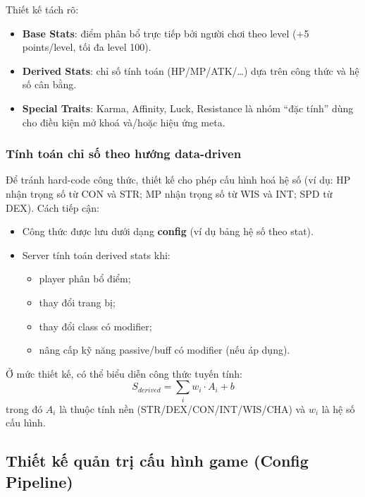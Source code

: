 Thiết kế tách rõ:
\begin{itemize}
    \item \textbf{Base Stats}: điểm phân bổ trực tiếp bởi người chơi theo level (+5 points/\allowbreak level, tối đa level 100).
    \item \textbf{Derived Stats}: chỉ số tính toán (HP/\allowbreak MP/\allowbreak ATK/\ldots) dựa trên công thức và hệ số cân bằng.
    \item \textbf{Special Traits}: Karma, Affinity, Luck, Resistance là nhóm ``đặc tính'' dùng cho điều kiện mở khoá và/\allowbreak hoặc hiệu ứng meta.
\end{itemize}

\subsubsection{Tính toán chỉ số theo hướng data-driven}
\label{subsubsec:design-stat-formula}

Để tránh hard-code công thức, thiết kế cho phép cấu hình hoá hệ số (ví dụ: HP nhận trọng số từ CON và STR; MP nhận trọng số từ WIS và INT; SPD từ DEX). Cách tiếp cận:
\begin{itemize}
    \item Công thức được lưu dưới dạng \textbf{config} (ví dụ bảng hệ số theo stat).
    \item Server tính toán derived stats khi:
    \begin{itemize}
        \item player phân bổ điểm;
        \item thay đổi trang bị;
        \item thay đổi class có modifier;
        \item nâng cấp kỹ năng passive/\allowbreak buff có modifier (nếu áp dụng).
    \end{itemize}
\end{itemize}

Ở mức thiết kế, có thể biểu diễn công thức tuyến tính:
\[
    S_{derived} = \sum_i w_i \cdot A_i + b
\]
trong đó $A_i$ là thuộc tính nền (STR/\allowbreak DEX/\allowbreak CON/\allowbreak INT/\allowbreak WIS/\allowbreak CHA) và $w_i$ là hệ số cấu hình.

\subsection{Thiết kế quản trị cấu hình game (Config Pipeline)}
\label{subsec:design-config-pipeline}

